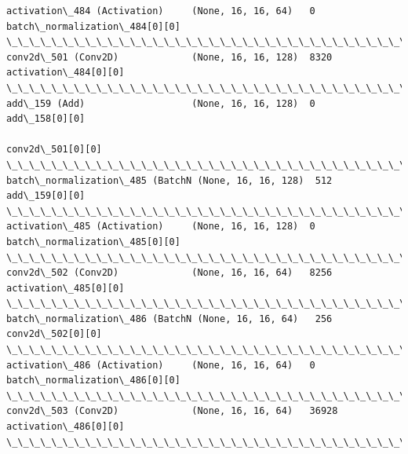 \documentclass[11pt]{article}
\begin{document}
\begin{Verbatim}[commandchars=\\\{\}]
activation\_484 (Activation)     (None, 16, 16, 64)   0           batch\_normalization\_484[0][0]    
\_\_\_\_\_\_\_\_\_\_\_\_\_\_\_\_\_\_\_\_\_\_\_\_\_\_\_\_\_\_\_\_\_\_\_\_\_\_\_\_\_\_\_\_\_\_\_\_\_\_\_\_\_\_\_\_\_\_\_\_\_\_\_\_\_\_\_\_\_\_\_\_\_\_\_\_\_\_\_\_\_\_\_\_\_\_\_\_\_\_\_\_\_\_\_\_\_\_
conv2d\_501 (Conv2D)             (None, 16, 16, 128)  8320        activation\_484[0][0]             
\_\_\_\_\_\_\_\_\_\_\_\_\_\_\_\_\_\_\_\_\_\_\_\_\_\_\_\_\_\_\_\_\_\_\_\_\_\_\_\_\_\_\_\_\_\_\_\_\_\_\_\_\_\_\_\_\_\_\_\_\_\_\_\_\_\_\_\_\_\_\_\_\_\_\_\_\_\_\_\_\_\_\_\_\_\_\_\_\_\_\_\_\_\_\_\_\_\_
add\_159 (Add)                   (None, 16, 16, 128)  0           add\_158[0][0]                    
                                                                 conv2d\_501[0][0]                 
\_\_\_\_\_\_\_\_\_\_\_\_\_\_\_\_\_\_\_\_\_\_\_\_\_\_\_\_\_\_\_\_\_\_\_\_\_\_\_\_\_\_\_\_\_\_\_\_\_\_\_\_\_\_\_\_\_\_\_\_\_\_\_\_\_\_\_\_\_\_\_\_\_\_\_\_\_\_\_\_\_\_\_\_\_\_\_\_\_\_\_\_\_\_\_\_\_\_
batch\_normalization\_485 (BatchN (None, 16, 16, 128)  512         add\_159[0][0]                    
\_\_\_\_\_\_\_\_\_\_\_\_\_\_\_\_\_\_\_\_\_\_\_\_\_\_\_\_\_\_\_\_\_\_\_\_\_\_\_\_\_\_\_\_\_\_\_\_\_\_\_\_\_\_\_\_\_\_\_\_\_\_\_\_\_\_\_\_\_\_\_\_\_\_\_\_\_\_\_\_\_\_\_\_\_\_\_\_\_\_\_\_\_\_\_\_\_\_
activation\_485 (Activation)     (None, 16, 16, 128)  0           batch\_normalization\_485[0][0]    
\_\_\_\_\_\_\_\_\_\_\_\_\_\_\_\_\_\_\_\_\_\_\_\_\_\_\_\_\_\_\_\_\_\_\_\_\_\_\_\_\_\_\_\_\_\_\_\_\_\_\_\_\_\_\_\_\_\_\_\_\_\_\_\_\_\_\_\_\_\_\_\_\_\_\_\_\_\_\_\_\_\_\_\_\_\_\_\_\_\_\_\_\_\_\_\_\_\_
conv2d\_502 (Conv2D)             (None, 16, 16, 64)   8256        activation\_485[0][0]             
\_\_\_\_\_\_\_\_\_\_\_\_\_\_\_\_\_\_\_\_\_\_\_\_\_\_\_\_\_\_\_\_\_\_\_\_\_\_\_\_\_\_\_\_\_\_\_\_\_\_\_\_\_\_\_\_\_\_\_\_\_\_\_\_\_\_\_\_\_\_\_\_\_\_\_\_\_\_\_\_\_\_\_\_\_\_\_\_\_\_\_\_\_\_\_\_\_\_
batch\_normalization\_486 (BatchN (None, 16, 16, 64)   256         conv2d\_502[0][0]                 
\_\_\_\_\_\_\_\_\_\_\_\_\_\_\_\_\_\_\_\_\_\_\_\_\_\_\_\_\_\_\_\_\_\_\_\_\_\_\_\_\_\_\_\_\_\_\_\_\_\_\_\_\_\_\_\_\_\_\_\_\_\_\_\_\_\_\_\_\_\_\_\_\_\_\_\_\_\_\_\_\_\_\_\_\_\_\_\_\_\_\_\_\_\_\_\_\_\_
activation\_486 (Activation)     (None, 16, 16, 64)   0           batch\_normalization\_486[0][0]    
\_\_\_\_\_\_\_\_\_\_\_\_\_\_\_\_\_\_\_\_\_\_\_\_\_\_\_\_\_\_\_\_\_\_\_\_\_\_\_\_\_\_\_\_\_\_\_\_\_\_\_\_\_\_\_\_\_\_\_\_\_\_\_\_\_\_\_\_\_\_\_\_\_\_\_\_\_\_\_\_\_\_\_\_\_\_\_\_\_\_\_\_\_\_\_\_\_\_
conv2d\_503 (Conv2D)             (None, 16, 16, 64)   36928       activation\_486[0][0]             
\_\_\_\_\_\_\_\_\_\_\_\_\_\_\_\_\_\_\_\_\_\_\_\_\_\_\_\_\_\_\_\_\_\_\_\_\_\_\_\_\_\_\_\_\_\_\_\_\_\_\_\_\_\_\_\_\_\_\_\_\_\_\_\_\_\_\_\_\_\_\_\_\_\_\_\_\_\_\_\_\_\_\_\_\_\_\_\_\_\_\_\_\_\_\_\_\_\_

\end{Verbatim}
\end{document}

